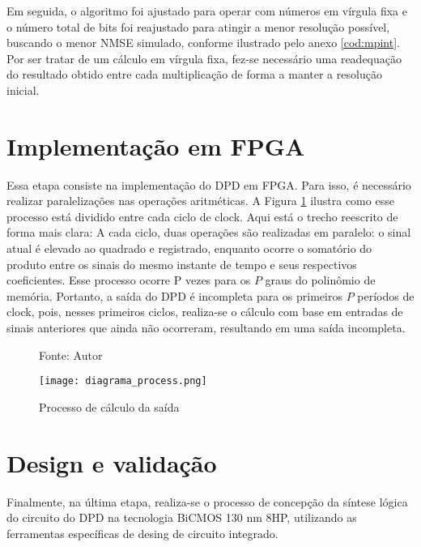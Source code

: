 Em seguida, o algoritmo foi ajustado para operar com números em vírgula fixa e o número total de bits foi reajustado para atingir a menor resolução possível, buscando o menor NMSE simulado, conforme ilustrado pelo anexo \ref{cod:mpint}. Por ser tratar de um cálculo em vírgula fixa, fez-se necessário uma readequação do resultado obtido entre cada multiplicação de forma a manter a resolução inicial.

\section{Implementação em FPGA}
Essa etapa consiste na implementação do DPD em FPGA. Para isso, é necessário realizar paralelizações nas operações aritméticas. A Figura \ref{fig:diagramaprocess} ilustra como esse processo está dividido entre cada ciclo de clock. Aqui está o trecho reescrito de forma mais clara: A cada ciclo, duas operações são realizadas em paralelo: o sinal atual é elevado ao quadrado e registrado, enquanto ocorre o somatório do produto entre os sinais do mesmo instante de tempo e seus respectivos coeficientes. Esse processo ocorre P vezes para os \( P \) graus do polinômio de memória. Portanto, a saída do DPD é incompleta para os primeiros \( P \) períodos de clock, pois, nesses primeiros ciclos, realiza-se o cálculo com base em entradas de sinais anteriores que ainda não ocorreram, resultando em uma saída incompleta.

\begin{figure}[ht!]
  \centering
  \captionsetup{justification=centering}
  \caption*{Fonte: Autor}
  \texttt{[image: diagrama\_process.png]}
  \caption{Processo de cálculo da saída}
  \label{fig:diagramaprocess}
\end{figure}

\section{Design e validação}
Finalmente, na última etapa, realiza-se o processo de concepção da síntese lógica do circuito do DPD  na tecnologia BiCMOS 130 nm 8HP, utilizando as ferramentas específicas de desing de circuito integrado. 

